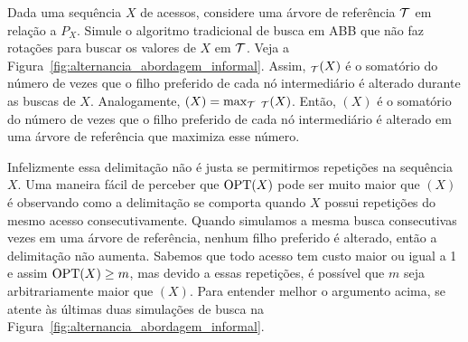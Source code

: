 Dada uma sequência $X$ de acessos, considere uma árvore de referência $\mathcal{T}$ em relação a $P_X$. Simule o algoritmo tradicional de busca em ABB que não faz rotações para buscar os valores de $X$ em $\mathcal{T}$. Veja a Figura~\ref{fig:alternancia_abordagem_informal}. Assim, \Alt$_{\mathcal{T}}(X)$ é o somatório do número de vezes que o filho preferido de cada nó intermediário é alterado durante as buscas de $X$. Analogamente, \Alt$(X) = \max_{\mathcal{T}}$ \Alt$_{\mathcal{T}}(X)$. Então, \Alt$(X)$ é o somatório do número de vezes que o filho preferido de cada nó intermediário é alterado em uma árvore de referência que maximiza esse número.

Infelizmente essa delimitação não é justa se permitirmos repetições na sequência $X$. Uma maneira fácil de perceber que $\mathrm{OPT}(X)$ pode ser muito maior que \Alt$(X)$ é observando como a delimitação se comporta quando $X$ possui repetições do mesmo acesso consecutivamente. Quando simulamos a mesma busca consecutivas vezes em uma árvore de referência, nenhum filho preferido é alterado, então a delimitação não aumenta. Sabemos que todo acesso tem custo maior ou igual a 1 e assim $\mathrm{OPT}(X) \geq m$, mas devido a essas repetições, é possível que $m$ seja arbitrariamente maior que \Alt$(X)$. Para entender melhor o argumento acima, se atente às últimas duas simulações de busca na Figura~\ref{fig:alternancia_abordagem_informal}.

